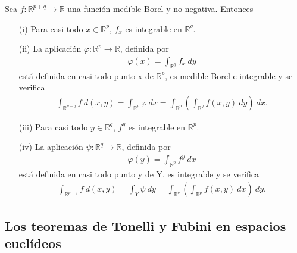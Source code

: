 \begin{cor}
Sea $f: \mathbb{R}^{p+q} \longrightarrow \mathbb{R}$ una función medible-Borel y no negativa. Entonces
\begin{enumerate}
    \item[(i)] Para casi todo $x \in \mathbb{R}^p$, $f_x$ es integrable en $\mathbb{R}^q$.
    \item[(ii)] La aplicación $\varphi: \mathbb{R}^p \longrightarrow \mathbb{R}$, definida por
    \begin{align*}
        \varphi(x) = \int_{\mathbb{R}^q}{f_x \ dy}
    \end{align*}
    está definida en casi todo punto x de $\mathbb{R}^p$, es medible-Borel e integrable y se verifica
    \begin{align*}
        \int_{\mathbb{R}^{p+q}}{f \ d(x,y)} = \int_{\mathbb{R}^p}{\varphi \ dx} = \int_{\mathbb{R}^p}\left( \int_{\mathbb{R}^q}{f(x,y) \ dy}\right) \ dx.
    \end{align*}
    \item[(iii)] Para casi todo $y \in \mathbb{R}^q$, $f^y$ es integrable en $\mathbb{R}^p$.
    \item[(iv)] La aplicación $\psi: \mathbb{R}^q \longrightarrow \mathbb{R}$, definida por
    \begin{align*}
        \varphi(y) = \int_{\mathbb{R}^p}{f^y \ dx}
    \end{align*}
    está definida en casi todo punto y de Y, es integrable  y se verifica
    \begin{align*}
        \int_{\mathbb{R}^{p+q}}{f \ d(x,y)} = \int_{Y}{\psi \ dy} = \int_{\mathbb{R}^q}\left( \int_{\mathbb{R}^p}{f(x,y) \ dx}\right) \ dy.
    \end{align*}
\end{enumerate}
\end{cor}

\subsection{Los teoremas de Tonelli y Fubini en espacios euclídeos}


